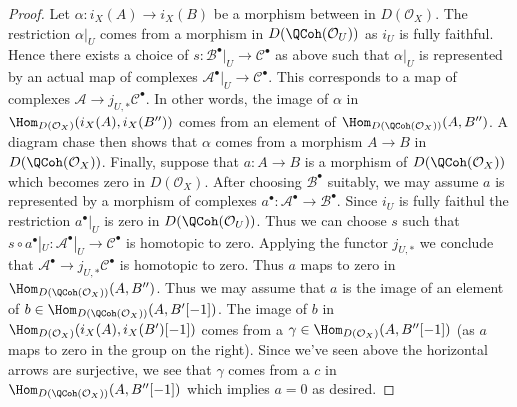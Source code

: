 \begin{proof}
\medskip\noindent
Let $\alpha : i_X(A) \to i_X(B)$ be a morphism between
in $D(\mathcal{O}_X)$. The restriction $\alpha|_U$ comes from a
morphism in $D(\QCoh(\mathcal{O}_U))$ as $i_U$ is fully faithful.
Hence there exists a choice of
$s : \mathcal{B}^\bullet|_U \to \mathcal{C}^\bullet$ as above
such that $\alpha|_U$ is represented by an actual map of complexes
$\mathcal{A}^\bullet|_U \to \mathcal{C}^\bullet$.
This corresponds to a map of complexes
$\mathcal{A} \to j_{U, *}\mathcal{C}^\bullet$.
In other words, the image of $\alpha$ in
$\Hom_{D(\mathcal{O}_X)}(i_X(A), i_X(B''))$ comes from
an element of $\Hom_{D(\QCoh(\mathcal{O}_X))}(A, B'')$.
A diagram chase then shows that $\alpha$ comes from a morphism
$A \to B$ in $D(\QCoh(\mathcal{O}_X))$. Finally, suppose
that $a : A \to B$ is a morphism of $D(\QCoh(\mathcal{O}_X))$
which becomes zero in $D(\mathcal{O}_X)$. After choosing $\mathcal{B}^\bullet$
suitably, we may assume $a$ is represented by a morphism of complexes
$a^\bullet : \mathcal{A}^\bullet \to \mathcal{B}^\bullet$.
Since $i_U$ is fully faithul the restriction $a^\bullet|_U$ is zero
in $D(\QCoh(\mathcal{O}_U))$. Thus we can choose $s$
such that
$s \circ a^\bullet|_U : \mathcal{A}^\bullet|_U \to \mathcal{C}^\bullet$
is homotopic to zero. Applying the functor $j_{U, *}$ we conclude that
$\mathcal{A}^\bullet \to j_{U, *}\mathcal{C}^\bullet$ is homotopic
to zero. Thus $a$ maps to zero in
$\Hom_{D(\QCoh(\mathcal{O}_X))}(A, B'')$.
Thus we may assume that $a$ is the image of an element
of $b \in \Hom_{D(\QCoh(\mathcal{O}_X))}(A, B'[-1])$.
The image of $b$ in $\Hom_{D(\mathcal{O}_X)}(i_X(A), i_X(B')[-1])$
comes from a $\gamma \in \Hom_{D(\mathcal{O}_X)}(A, B''[-1])$
(as $a$ maps to zero in the group on the right). Since we've
seen above the horizontal arrows are surjective, we see
that $\gamma$ comes from a $c$ in
$\Hom_{D(\QCoh(\mathcal{O}_X))}(A, B''[-1])$
which implies $a = 0$ as desired.


\end{proof}
